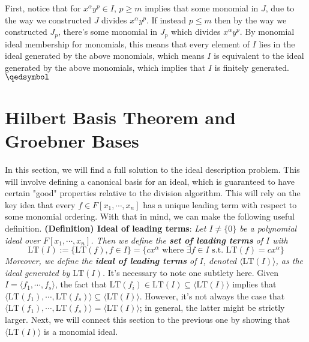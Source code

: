 \documentclass{article}
\begin{document}
First, notice that for $ x^\alpha y^p \in I $, $ p \geq m $ implies that some monomial in $ J $, due to the way we constructed $ J $ divides $ x^\alpha y^p $. If instead $ p \leq m $ then by the way we constructed $ J_p $, there's some monomial in $ J_p $ which divides $ x^\alpha y^p $. By monomial ideal membership for monomials, this means that every element of $ I $ lies in the ideal generated by the above monomials, which means $ I $ is equivalent to the ideal generated by the above monomials, which implies that $ I $ is finitely generated. $ \qedsymbol $

\section{Hilbert Basis Theorem and Groebner Bases}
In this section, we will find a full solution to the ideal description problem. This will involve defining a canonical basis for an ideal, which is guaranteed to have certain "good" properties relative to the division algorithm. This will rely on the key idea that every $ f \in F[x_1, \cdots, x_n] $ has a unique leading term with respect to some monomial ordering. With that in mind, we can make the following useful definition.
\newline \newline
\textbf{(Definition) Ideal of leading terms}: \textit{Let $ I \neq \{ 0 \} $ be a polynomial ideal over $ F[x_1, \cdots, x_n] $. Then we define the \textbf{set of leading terms} of $ I $ with}
$$ \text{LT}(I) := \{ \text{LT}(f), f \in I \} = \{ c x^\alpha \text{ where } \exists f \in I \text{ s.t. } \text{LT}(f) = c x^\alpha \} $$
\indent \textit{Moreover, we define the \textbf{ideal of leading terms} of $ I $, denoted $ \langle \text{LT}(I) \rangle $, as the ideal generated by $ \text{LT}(I) $.}
\newline \newline
It's necessary to note one subtlety here. Given $ I = \langle f_1, \cdots, f_s \rangle $, the fact that $ \text{LT}(f_i) \in \text{LT}(I) \subseteq \langle \text{LT}(I) \rangle $ implies that $ \langle \text{LT}(f_1), \cdots, \text{LT}(f_s) \rangle \subseteq \langle \text{LT}(I) \rangle $. However, it's not always the case that $ \langle \text{LT}(f_1), \cdots, \text{LT}(f_s) \rangle = \langle \text{LT}(I) \rangle $; in general, the latter might be strictly larger.
\newline
Next, we will connect this section to the previous one by showing that $ \langle \text{LT}(I) \rangle $ is a monomial ideal.
\newline \newline
\end{document}
